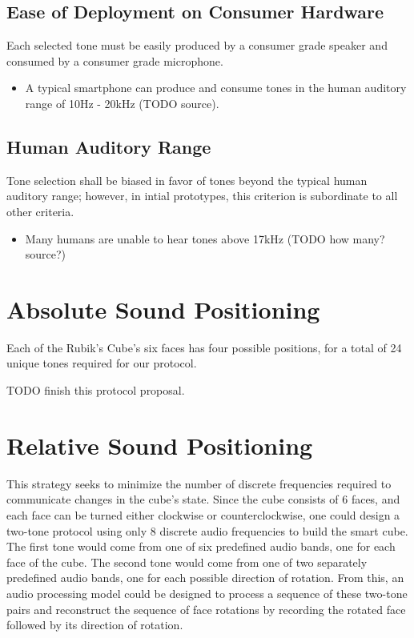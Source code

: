 \subsection{Ease of Deployment on Consumer Hardware}
Each selected tone must be easily produced by a consumer grade speaker and consumed by a consumer grade microphone.
\begin{itemize}
    \item A typical smartphone can produce and consume tones in the human auditory range of 10Hz - 20kHz (TODO source).
\end{itemize}

\subsection{Human Auditory Range}
Tone selection shall be biased in favor of tones beyond the typical human auditory range; however, in intial prototypes, this criterion is subordinate to all other criteria.
\begin{itemize}
    \item Many humans are unable to hear tones above 17kHz (TODO how many? source?)
\end{itemize}


\section{Absolute Sound Positioning}

Each of the Rubik's Cube's six faces has four possible positions, for a total of 24 unique tones required for our protocol.

TODO finish this protocol proposal.


\section{Relative Sound Positioning}

This strategy seeks to minimize the number of discrete frequencies required to communicate changes in the cube's state. Since the cube consists of 6 faces, and each face can be turned either clockwise or counterclockwise, one could design a two-tone protocol using only 8 discrete audio frequencies to build the smart cube. The first tone would come from one of six predefined audio bands, one for each face of the cube. The second tone would come from one of two separately predefined audio bands, one for each possible direction of rotation. From this, an audio processing model could be designed to process a sequence of these two-tone pairs and reconstruct the sequence of face rotations by recording the rotated face followed by its direction of rotation.

